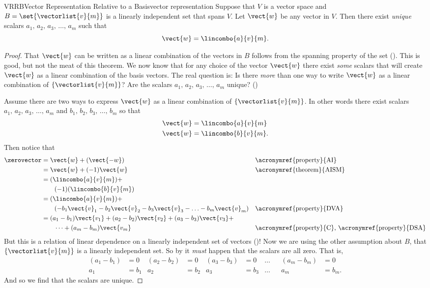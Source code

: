 %
\begin{theorem}{VRRB}{Vector Representation Relative to a Basis}{vector representation}
Suppose that $V$ is a vector space and $B=\set{\vectorlist{v}{m}}$ is a linearly independent set that spans $V$.  Let $\vect{w}$ be any vector in $V$.  Then there exist {\em unique} scalars $a_1,\,a_2,\,a_3,\,\ldots,\,a_m$ such that 
%
\begin{equation*}
\vect{w}=\lincombo{a}{v}{m}.
\end{equation*}
%
\end{theorem}
%
\begin{proof}
That $\vect{w}$ can be written as a linear combination of the vectors in $B$ follows from the spanning property of the set ().  This is good, but not the meat of this theorem.  We now know that for any choice of the vector $\vect{w}$ there exist {\em some} scalars that will create $\vect{w}$ as a linear combination of the basis vectors.  The real question is:  Is there {\em more} than one way to write $\vect{w}$ as a linear combination of $\{\vectorlist{v}{m}\}$?  Are the scalars $a_1,\,a_2,\,a_3,\,\ldots,\,a_m$ unique?  ()\par
%
Assume there are two ways to express $\vect{w}$ as a linear combination of $\{\vectorlist{v}{m}\}$.  In other words there exist scalars $a_1,\,a_2,\,a_3,\,\ldots,\,a_m$ and $b_1,\,b_2,\,b_3,\,\ldots,\,b_m$ so that 
%
\begin{align*}
\vect{w}&=\lincombo{a}{v}{m}\\
\vect{w}&=\lincombo{b}{v}{m}.
\end{align*}
%
Then notice that
%
\begin{align*}
\zerovector
&=\vect{w}+(\vect{-w})&&\text{\acronymref{property}{AI}}\\
%
&=\vect{w}+(-1)\vect{w}&&\text{\acronymref{theorem}{AISM}}\\
%
&=(\lincombo{a}{v}{m})+\\
&\quad\quad(-1)(\lincombo{b}{v}{m})\\
%
&=(\lincombo{a}{v}{m})+\\
&\quad\quad (-b_1\vect{v}_1-b_2\vect{v}_2-b_3\vect{v}_3-\ldots-b_m\vect{v}_m)&&\text{\acronymref{property}{DVA}}\\
%  
&=(a_1-b_1)\vect{v_1}+(a_2-b_2)\vect{v_2}+(a_3-b_3)\vect{v_3}+\\
&\quad\quad\cdots+(a_m-b_m)\vect{v_m}&&\text{\acronymref{property}{C}, \acronymref{property}{DSA}}
\end{align*}
%
But this is a relation of linear dependence on a linearly independent set of vectors ()! Now we are using the other assumption about $B$, that $\{\vectorlist{v}{m}\}$ is a linearly independent set.   So by  it {\em must} happen that the scalars are all zero.  That is,
%
\begin{align*}
(a_1-b_1)&=0&(a_2-b_2)&=0&(a_3-b_3)&=0&\ldots&&(a_m-b_m)&=0\\
a_1&=b_1&a_2&=b_2&a_3&=b_3&\ldots&&a_m&=b_m.
\end{align*}
%
And so we find that the scalars are unique.
%
\end{proof}
